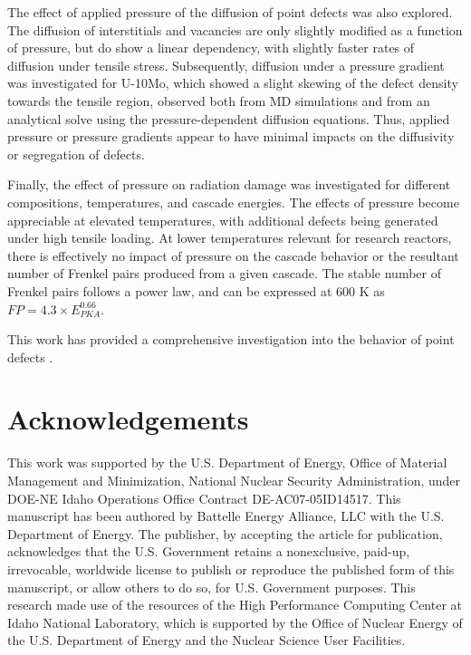 \documentclass[review]{elsarticle}
\providecommand{\DIFadd}[1]{{\sf #1}} %
\providecommand{\DIFdel}[1]{{[..\footnote{removed: #1} ]}} %
\providecommand{\DIFaddbegin}{\protect\color{blue}} %
\providecommand{\DIFaddend}{\protect\color{black}} %
\providecommand{\DIFdelbegin}{\protect\color{red}} %
\providecommand{\DIFdelend}{\protect\color{black}} %
\newcommand{\DIFscaledelfig}{0.5}
\newlength{\DIFdelgraphicswidth} %
\newlength{\DIFdelgraphicsheight} %
\newcommand{\DIFaddincludegraphics}[2][]{{\color{blue}\fbox{\DIFOincludegraphics[#1]{#2}}}} %
\newcommand{\DIFdelincludegraphics}[2][]{%
\sbox{\DIFdelgraphicsbox}{\DIFOincludegraphics[#1]{#2}}%
\settoboxwidth{\DIFdelgraphicswidth}{\DIFdelgraphicsbox} %
\settoboxtotalheight{\DIFdelgraphicsheight}{\DIFdelgraphicsbox} %
\scalebox{\DIFscaledelfig}{%
\parbox[b]{\DIFdelgraphicswidth}{\usebox{\DIFdelgraphicsbox}\\[-\baselineskip] \rule{\DIFdelgraphicswidth}{0em}}\llap{\resizebox{\DIFdelgraphicswidth}{\DIFdelgraphicsheight}{%
\setlength{\unitlength}{\DIFdelgraphicswidth}%
\begin{picture}(1,1)%
\thicklines\linethickness{2pt} %
{\color[rgb]{1,0,0}\put(0,0){\framebox(1,1){}}}%
{\color[rgb]{1,0,0}\put(0,0){\line( 1,1){1}}}%
{\color[rgb]{1,0,0}\put(0,1){\line(1,-1){1}}}%
\end{picture}%
}\hspace*{3pt}}} %
} %
\DeclareRobustCommand{\DIFaddbegin}{\DIFOaddbegin \let\includegraphics\DIFaddincludegraphics} %
\DeclareRobustCommand{\DIFaddend}{\DIFOaddend \let\includegraphics\DIFOincludegraphics} %
\DeclareRobustCommand{\DIFdelbegin}{\DIFOdelbegin \let\includegraphics\DIFdelincludegraphics} %
\DeclareRobustCommand{\DIFdelend}{\DIFOaddend \let\includegraphics\DIFOincludegraphics} %
\begin{document}
\DIFadd{The effect of applied pressure of the diffusion of point defects was also explored. The diffusion of interstitials and vacancies are only slightly modified as a function of pressure, but do show a linear dependency, with slightly faster rates of diffusion under tensile stress. Subsequently, diffusion under a pressure gradient was investigated for U-10Mo, which showed a slight skewing of the defect density towards the tensile region, observed both from MD simulations and from an analytical solve using the pressure-dependent diffusion equations. Thus, applied pressure or pressure gradients appear to have minimal impacts on the diffusivity or segregation of defects. 
}

\DIFadd{Finally, the effect of pressure on radiation damage was investigated for different compositions, temperatures, and cascade energies. The effects of pressure become appreciable at elevated temperatures, with additional defects being generated under high tensile loading. At lower temperatures relevant for research reactors, there is effectively no impact of pressure on the cascade behavior or the resultant number of Frenkel pairs produced from a given cascade. The stable number of Frenkel pairs follows a power law, and can be expressed at 600 K as $FP = 4.3 \times E_{PKA}^{0.66}$. 
}

\DIFadd{This work has provided a comprehensive investigation into the behavior }\DIFaddend of point defects \DIFdelbegin \DIFdel{due to applied pressure}\DIFdelend \DIFaddbegin \DIFadd{under applied stresses in U-Mo alloys. This work can be incorporated into mesoscale and engineering scale modeling tools that include defect-stress interactions to describe complex phenomena such as fuel creep and fission gas swelling}\DIFaddend . 


\section{Acknowledgements}\label{sec5}
This work was supported by the U.S. Department of Energy, Office of Material Management and Minimization, National Nuclear Security Administration, under DOE-NE Idaho Operations Office Contract DE-AC07-05ID14517. This manuscript has been authored by Battelle Energy Alliance, LLC with the U.S. Department of Energy. The publisher, by accepting the article for publication, acknowledges that the U.S. Government retains a nonexclusive, paid-up, irrevocable, worldwide license to publish or reproduce the published form of this manuscript, or allow others to do so, for U.S. Government purposes. This research made use of the resources of the High Performance Computing Center at Idaho National Laboratory, which is supported by the Office of Nuclear Energy of the U.S. Department of Energy and the Nuclear Science User Facilities.
\end{document}
